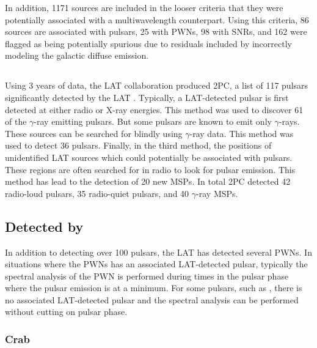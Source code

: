 In addition, 1171 sources are included in the looser criteria that
they were potentially associated with a multiwavelength counterpart.
Using this criteria, 86 sources are associated with pulsars, 25 with
\acp{PWN},  98 with \acp{SNR}, and 162 were flagged as being potentially
spurious due to residuals included by incorrectly modeling the galactic
diffuse emission.

\subsection{}
\subseclabel{2pc}

Using 3 years of data, the \ac{LAT} collaboration produced \acf{2PC},
a list of 117 pulsars significantly detected by the \ac{LAT}
\citep{abdo_2013a_second-fermi}.  Typically, a \ac{LAT}-detected pulsar is
first detected at either radio or X-ray energies.  This method was used
to discover 61 of the $\gamma$-ray emitting pulsars.  But some pulsars
are known to emit only $\gamma$-rays.  These sources can be searched
for blindly using $\gamma$-ray data.  This method was used to detect
36 pulsars.  Finally, in the third method, the positions of unidentified
\ac{LAT} sources which could potentially be associated with pulsars.
These regions are often searched for in radio to look for pulsar
emission. This method has lead to the detection of 20 new \acp{MSP}.
In total \ac{2PC} detected 42 radio-loud pulsars, 35 radio-quiet pulsars,
and 40 $\gamma$-ray \acp{MSP}.

\subsection{ Detected by }

In addition to detecting over 100 pulsars, the \ac{LAT} has detected
several \acp{PWN}.  In situations where the \acp{PWN} has an associated
\ac{LAT}-detected pulsar, typically the spectral analysis of the
\ac{PWN} is performed during times in the pulsar phase where the
pulsar emission is at a minimum. For some pulsars, such as ,
there is no associated \ac{LAT}-detected pulsar and the spectral analysis
can be performed without cutting on pulsar phase.

\subsubsection{Crab}


